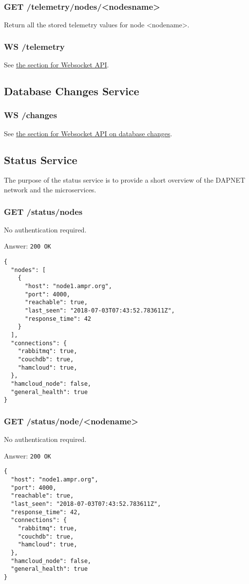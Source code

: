 \subsubsection{GET /telemetry/nodes/<nodesname>}
Return all the stored telemetry values for node <nodename>.

\subsubsection{WS /telemetry}
See \hyperref[protocoldef:websocketapi]{the section for Websocket API}.


\subsection{Database Changes Service}

\subsubsection{WS /changes}
See \hyperref[protcoldef:websocketapi:databasechanges]{the section for Websocket API on database changes}.

\subsection{Status Service}
The purpose of the status service is to provide a short overview of the DAPNET network and the microservices.

\subsubsection{GET /status/nodes}
No authentication required.

Answer:
\texttt{200 OK}
\begin{lstlisting}
{
  "nodes": [
    {
      "host": "node1.ampr.org",
      "port": 4000,
      "reachable": true,
      "last_seen": "2018-07-03T07:43:52.783611Z",
      "response_time": 42
    }
  ],
  "connections": {
    "rabbitmq": true,
    "couchdb": true,
    "hamcloud": true,
  },
  "hamcloud_node": false,
  "general_health": true
}
\end{lstlisting}

\subsubsection{GET /status/node/<nodename>}
No authentication required.

Answer:
\texttt{200 OK}
\begin{lstlisting}
{
  "host": "node1.ampr.org",
  "port": 4000,
  "reachable": true,
  "last_seen": "2018-07-03T07:43:52.783611Z",
  "response_time": 42,
  "connections": {
    "rabbitmq": true,
    "couchdb": true,
    "hamcloud": true,
  },
  "hamcloud_node": false,
  "general_health": true
}
\end{lstlisting}


